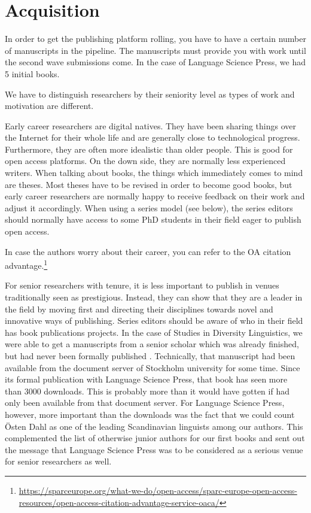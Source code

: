 \documentclass[guidelines,nonflat,modfonts] {langsci/langscibook}
\begin{document}
\section{Acquisition}
In order to get the publishing platform rolling, you have to have a certain number of manuscripts in the pipeline. The manuscripts must provide you with work until the second wave submissions come. In the case of Language Science Press, we had 5%
 initial books. 

We have to distinguish researchers by their seniority level as types of work and motivation are different. 

Early career researchers are digital natives. They have been sharing things over the Internet for their whole life and are generally close to technological progress. Furthermore, they are often more idealistic than older people. This is good for open access platforms. On the down side, they are normally less experienced writers. When talking about books, the things which immediately comes to mind are theses. Most theses have to be revised in order to become good books, but early career researchers are normally happy to receive feedback on their work and adjust it accordingly. When using a series model (see below), the series editors should normally have access to some PhD students in their field eager to publish open access. 

In case the authors worry about their career, you can refer to the OA citation advantage.\footnote{\url{https://sparceurope.org/what-we-do/open-access/sparc-europe-open-access-resources/open-access-citation-advantage-service-oaca/}}

For senior researchers with tenure, it is less important to publish in venues traditionally seen as prestigious. Instead, they can show that they are a leader in the field by moving first and directing their disciplines towards novel and innovative ways of publishing. 
Series editors should be aware of who in their field has book publications projects. In the case of Studies in Diversity Linguistics, we were able to get a manuscripts from a senior scholar which was already finished, but had never been formally published \citep{Dahl2016}. Technically, that manuscript had been available from the document server of Stockholm university for some time. Since its formal publication with Language Science Press, that book has seen more than 3000 downloads. This is probably more than it would have gotten if had only been available from that document server. For Language Science Press, however, more important than the downloads  was the fact that we could count Östen Dahl as one of the leading Scandinavian linguists among our authors. This complemented the list of otherwise junior authors for our first books and sent out the message that Language Science Press was to be considered as a serious venue for senior researchers as well. 
\end{document}

